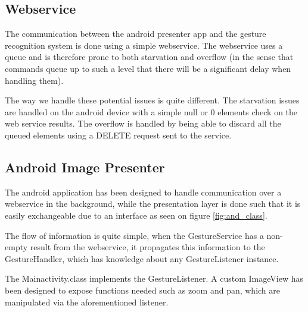 \subsection{Webservice}
The communication between the android presenter app and the gesture recognition system is done using a simple webservice.
The webservice uses a queue and is therefore prone to both starvation and overflow
(in the sense that commands queue up to such a level that there will be a significant delay when handling them).

The way we handle these potential issues is quite different.
The starvation issues are handled on the android device with a simple null or 0 elements check on the web service results.
The overflow is handled by being able to discard all the queued elements using a DELETE request sent to the service.

\subsection{Android Image Presenter}
The android application has been designed to handle communication over a webservice in the background, 
while the presentation layer is done such that it is easily exchangeable due to an interface as seen on figure \ref{fig:and_class}.

The flow of information is quite simple, when the GestureService has a non-empty result from the webservice,
it propagates this information to the GestureHandler, which has knowledge about any GestureListener instance.

The Mainactivity.class implements the GestureListener.
A custom ImageView has been designed to expose functions needed such as zoom and pan, which are manipulated via the aforementioned listener.
